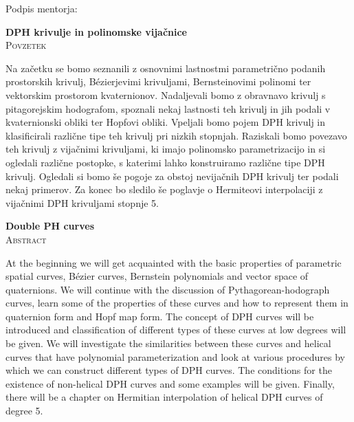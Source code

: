 \documentclass[12pt,a4paper,twoside]{article}
\newcommand{\naslovdela}{DPH krivulje in polinomske vijačnice}
\theoremstyle{definition} %
\theoremstyle{plain} %
\theoremstyle{primerstyle}
\numberwithin{equation}{section}  %
\begin{document}
\vspace{2cm}
\hspace*{\fill} Podpis mentorja: \phantom{prostor za podpis}


\cleardoublepage
{}

\begin{center}
\textbf{\naslovdela} \\[3mm]
\textsc{Povzetek} \\[2mm]
\end{center}

Na začetku se bomo seznanili z osnovnimi lastnostmi parametrično podanih prostorskih krivulj, Bézierjevimi krivuljami, Bernsteinovimi polinomi ter vektorskim prostorom kvaternionov. Nadaljevali bomo z obravnavo krivulj s pitagorejskim hodografom, spoznali nekaj lastnosti teh krivulj in jih podali v kvaternionski obliki ter Hopfovi obliki. Vpeljali bomo pojem DPH krivulj in klasificirali različne tipe teh krivulj pri nizkih stopnjah. Raziskali bomo povezavo teh krivulj z vijačnimi krivuljami, ki imajo polinomsko parametrizacijo in si ogledali različne postopke, s katerimi lahko konstruiramo različne tipe DPH krivulj. Ogledali si bomo še pogoje za obstoj nevijačnih DPH krivulj ter podali nekaj primerov. Za konec bo sledilo še poglavje o Hermiteovi interpolaciji z vijačnimi DPH krivuljami stopnje 5.

\vfill
\begin{center}
\textbf{Double PH curves} \\[3mm] %
\textsc{Abstract}\\[2mm]
\end{center}

At the beginning we will get acquainted with the basic properties of parametric spatial curves, Bézier curves, Bernstein polynomials and vector space of quaternions. We will continue with the discussion of Pythagorean-hodograph curves, learn some of the properties of these curves and how to represent them in quaternion form and Hopf map form. The concept of DPH curves will be introduced and classification of different types of these curves at low degrees will be given. We will investigate the similarities between these curves and helical curves that have polynomial parameterization and look at various procedures by which we can construct different types of DPH curves. The conditions for the existence of non-helical DPH curves and some examples will be given. Finally, there will be a chapter on Hermitian interpolation of helical DPH curves of degree 5. 
\end{document}
